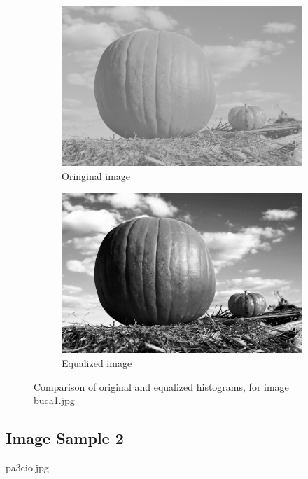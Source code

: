 \documentclass[10pt]{article}
\begin{document}
\begin{figure}[ht]
  \centering
  \begin{subfigure}[c]{0.4\textwidth}
    \includegraphics[width=\textwidth]{images/buca1.jpg}
    \caption{Oringinal image}
    \label{fig:original-histogram}
  \end{subfigure}
  \begin{subfigure}[d]{0.4\textwidth}
    \includegraphics[width=\textwidth]{images/buca1_out.jpg}
    \caption{Equalized image}
    \label{fig:equalized-histogram}
  \end{subfigure}
  \caption{Comparison of original and equalized histograms, for image buca1.jpg}
\end{figure}

\pagebreak

\subsection{Image Sample 2}
pa3cio.jpg\\
\end{document}
